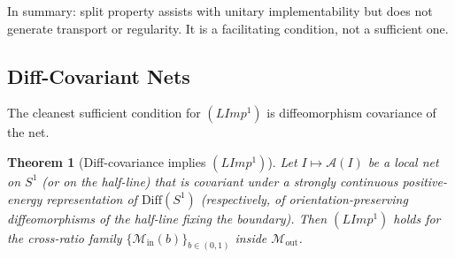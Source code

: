 \documentclass[12pt]{article}
\newtheorem{theorem}{Theorem}[section]
\theoremstyle{definition}
\theoremstyle{remark}
\begin{document}
In summary: split property assists with unitary implementability but does not generate transport or regularity. It is a facilitating condition, not a sufficient one.

\subsection{Diff-Covariant Nets}\label{diff-covariant-nets}

The cleanest sufficient condition for $(LImp^1)$ is diffeomorphism covariance of the net.

\begin{theorem}[Diff-covariance implies $(LImp^1)$]\label{thm:diff-limp}
Let $I \mapsto \mathcal{A}(I)$ be a local net on $S^1$ (or on the half-line) that is covariant under a strongly continuous positive-energy representation of $\mathrm{Diff}(S^1)$ (respectively, of orientation-preserving diffeomorphisms of the half-line fixing the boundary). Then $(LImp^1)$ holds for the cross-ratio family $\{\mathcal{M}_{\mathrm{in}}(b)\}_{b \in (0,1)}$ inside $\mathcal{M}_{\mathrm{out}}$.
\end{theorem}
\end{document}

